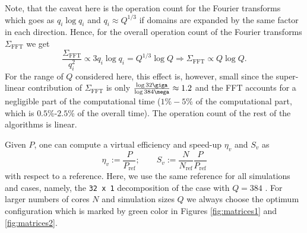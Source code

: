 Note, that the caveat here is the operation count for the Fourier transforms
which goes as $q_i \log q_i$ and $q_i \approx Q^{1/3}$ if domains are expanded
by the same factor in each direction. Hence, for the overall operation count of
the Fourier transforms $\Sigma_\mathrm{FFT}$ we get
\begin{equation}
\frac{\Sigma_{\mathrm{FFT}}}{q_{i}^{2}}\propto 3 q_i \log q_i = Q^{1/3} \log
Q\Rightarrow \Sigma_\mathrm{FFT}\propto Q\log Q.
\end{equation} 
For the range of $Q$ considered here, this effect is, however, small since the
super-linear contribution of $\Sigma_\mathrm{FFT}$ is only $\frac{\log 32\giga
}{\log 384\mega} \approx 1.2$ and the FFT accounts for a negligible part of the
computational time ($1\%-5$\% of the computational part, which is
$0.5$\%-$2.5$\% of the overall time).  The operation count of the rest of the
algorithms is linear.

Given $P$, one can compute a virtual efficiency and speed-up $\eta_v$ and $S_v$ as 
\begin{equation}
\eta_v:=\frac{P}{P_\mathrm{ref}}; \qquad S_v:=\frac{N}{N_\mathrm{ref}}\frac{P}{P_\mathrm{ref}}
\end{equation} 
with respect to a reference. Here, we use the same reference for all simulations
and cases, namely, the \texttt{32 x 1} decomposition of the case with
$Q=384$ \mega. For larger numbers of cores $N$ and simulation sizes $Q$ we
always choose the optimum configuration which is marked by green color in
Figures \ref{fig:matrices1} and \ref{fig:matrices2}.

